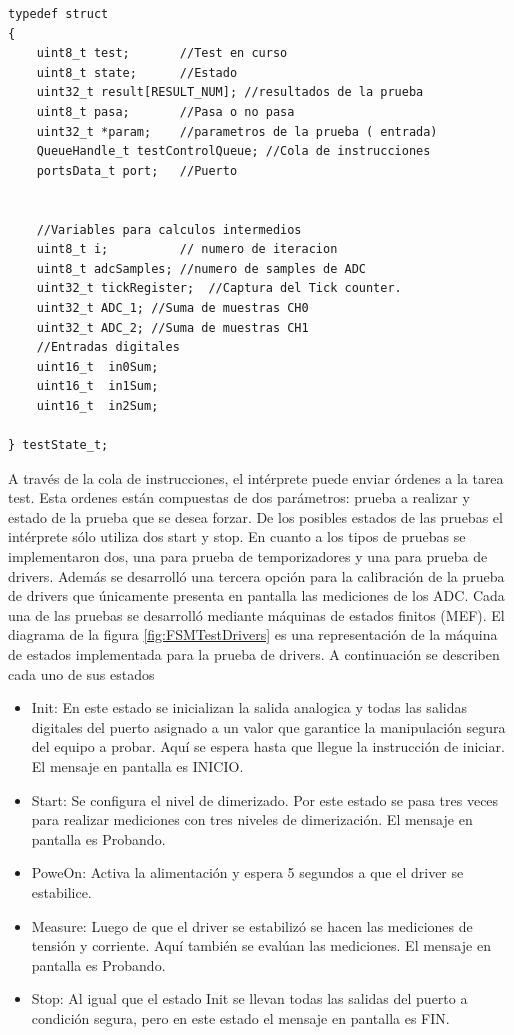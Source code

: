 \begin{lstlisting}[label=cod:estTestState, caption= Estructura de estado del test.]
typedef struct
{
	uint8_t test; 		//Test en curso
	uint8_t state; 		//Estado
	uint32_t result[RESULT_NUM]; //resultados de la prueba
	uint8_t pasa; 		//Pasa o no pasa
	uint32_t *param;	//parametros de la prueba ( entrada)
	QueueHandle_t testControlQueue; //Cola de instrucciones
	portsData_t port;	//Puerto


	//Variables para calculos intermedios
	uint8_t i;			// numero de iteracion
	uint8_t adcSamples; //numero de samples de ADC
	uint32_t tickRegister;	//Captura del Tick counter.
	uint32_t ADC_1; //Suma de muestras CH0
	uint32_t ADC_2; //Suma de muestras CH1
	//Entradas digitales
	uint16_t  in0Sum; 
	uint16_t  in1Sum;
	uint16_t  in2Sum;

} testState_t;
\end{lstlisting}

A través de la cola de instrucciones, el intérprete puede enviar órdenes a la tarea test. Esta ordenes están compuestas de dos parámetros: prueba a realizar y estado de la prueba que se desea forzar. De los posibles estados de las pruebas el intérprete sólo utiliza dos start y stop.
En cuanto a los tipos de pruebas se implementaron dos, una para prueba de temporizadores y una para prueba de drivers. Además se desarrolló una tercera opción para la calibración de la prueba de drivers que únicamente presenta en pantalla las mediciones de los ADC.
Cada una de las pruebas se desarrolló mediante máquinas de estados finitos (MEF). 
El diagrama de la figura \ref{fig:FSMTestDrivers} es una representación de la máquina de estados implementada para la prueba de drivers. A continuación se describen cada uno de sus estados
\begin{itemize}
	\item Init: En este estado se inicializan la salida analogica y todas las salidas digitales del puerto asignado a un valor que garantice la manipulación segura del equipo  a probar. Aquí se espera hasta que llegue la instrucción de iniciar. El mensaje en pantalla es INICIO.
	\item Start: Se configura el nivel de dimerizado. Por este estado se pasa tres veces para realizar mediciones con tres niveles de dimerización. El mensaje en pantalla es Probando.
	\item PoweOn: Activa la alimentación y espera 5 segundos a que el driver se estabilice.
	\item Measure: Luego de que el driver se estabilizó se hacen las mediciones de tensión y corriente. Aquí también se evalúan las mediciones. El mensaje en pantalla es Probando.
	\item Stop: Al igual que el estado Init se llevan todas las salidas del puerto a condición segura, pero en este estado el mensaje en pantalla es FIN.
\end{itemize}
	
